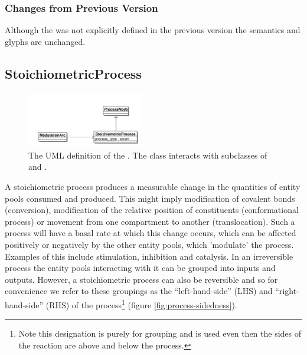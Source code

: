 \subsubsection{Changes from Previous Version}

Although the  was not explicitly defined in
the previous version the semantics and glyphs are unchanged.


\subsection{StoichiometricProcess}
\label{defn:StoichiometricProcess}\label{sec:stoichiometricprocess}

\begin{figure}[htb]
  \centering
  \includegraphics[width = 0.45\textwidth]{images/stoichprocessuml}
  \caption{The UML definition of the
    . The class interacts with
    subclasses of  and .}
  \label{fig:stoichprocessuml}
\end{figure}
 
A stoichiometric process produces a measurable change in the
quantities of entity pools consumed and produced. This might imply
modification of covalent bonds (conversion), modification of the
relative position of constituents (conformational process) or movement
from one compartment to another (translocation). Such a process will
have a basal rate at which this change occurs, which can be affected
positively or negatively by the other entity pools, which 'modulate'
the process. Examples of this include stimulation, inhibition and
catalysis. In an irreversible process the entity pools interacting
with it can be grouped into inputs and outputs. However, a
stoichiometric process can also be reversible and so for convenience
we refer to these groupings as the ``left-hand-side'' (LHS) and
``right-hand-side'' (RHS) of the process\footnote{Note this
  designation is purely for grouping and is used even then the sides
  of the reaction are above and below the process.}  (figure
\ref{fig:process-sidedness}).

